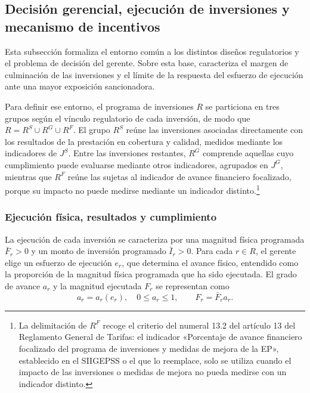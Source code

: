 \subsection{Decisión gerencial, ejecución de inversiones y mecanismo de incentivos}

Esta subsección formaliza el entorno común a los distintos diseños regulatorios y el problema de decisión del gerente. Sobre esta base, caracteriza el margen de culminación de las inversiones y el límite de la respuesta del esfuerzo de ejecución ante una mayor exposición sancionadora.

Para definir ese entorno, el programa de inversiones \(R\) se particiona en tres grupos según el vínculo regulatorio de cada inversión, de modo que \(R=R^{S}\mathbin{\cup}R^{G}\mathbin{\cup}R^{F}\). El grupo \(R^{S}\) reúne las inversiones asociadas directamente con los resultados de la prestación en cobertura y calidad, medidos mediante los indicadores de \(J^{S}\). Entre las inversiones restantes, \(R^{G}\) comprende aquellas cuyo cumplimiento puede evaluarse mediante otros indicadores, agrupados en \(J^{G}\), mientras que \(R^{F}\) reúne las sujetas al indicador de avance financiero focalizado, porque su impacto no puede medirse mediante un indicador distinto.\footnote{La delimitación de \(R^{F}\) recoge el criterio del numeral 13.2 del artículo 13 del Reglamento General de Tarifas: el indicador «Porcentaje de avance financiero focalizado del programa de inversiones y medidas de mejora de la EP», establecido en el SIIGEPSS o el que lo reemplace, solo se utiliza cuando el impacto de las inversiones o medidas de mejora no pueda medirse con un indicador distinto.}

\subsubsection{Ejecución física, resultados y cumplimiento}

La ejecución de cada inversión se caracteriza por una magnitud física programada \(\bar F_r>0\) y un monto de inversión programado \(\bar I_r>0\). Para cada \(r\in R\), el gerente elige un esfuerzo de ejecución \(e_r\), que determina el avance físico, entendido como la proporción de la magnitud física programada que ha sido ejecutada. El grado de avance \(a_r\) y la magnitud ejecutada \(F_r\) se representan como
\begin{equation}
\label{eq:ejecucion_fisica}
a_r=a_r(e_r),\quad 0\leq a_r\leq1,
\qquad
F_r=\bar F_r a_r.
\end{equation}

